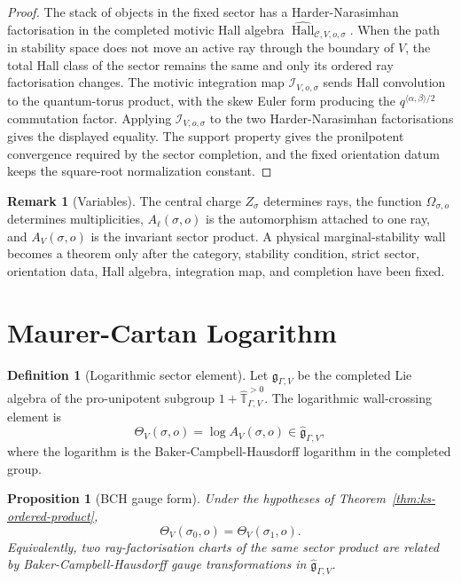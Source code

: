 \documentclass[11pt]{article}
\newtheorem{proposition}[theorem]{Proposition}
\theoremstyle{definition}
\newtheorem{definition}[theorem]{Definition}
\newtheorem{remark}[theorem]{Remark}
\providecommand{\cC}{\mathcal{C}}
\providecommand{\Hall}{\operatorname{Hall}}
\providecommand{\fg}{\mathfrak{g}}
\begin{document}
\begin{proof}
The stack of objects in the fixed sector has a Harder-Narasimhan
factorisation in the completed motivic Hall algebra
$\widehat{\Hall}_{\cC,V,o,\sigma}$.  When the path in stability space
does not move an active ray through the boundary of $V$, the total Hall
class of the sector remains the same and only its ordered ray
factorisation changes.  The motivic integration map
$\mathcal I_{V,o,\sigma}$ sends Hall convolution to the quantum-torus
product, with the skew Euler form producing the
$q^{\langle\alpha,\beta\rangle/2}$ commutation factor.  Applying
$\mathcal I_{V,o,\sigma}$ to the two Harder-Narasimhan
factorisations gives the displayed equality.  The support property gives
the pronilpotent convergence required by the sector completion, and the
fixed orientation datum keeps the square-root normalization constant.
\end{proof}

\begin{remark}[Variables]
The central charge $Z_\sigma$ determines rays, the function
$\Omega_{\sigma,o}$ determines multiplicities, $A_\ell(\sigma,o)$ is the
automorphism attached to one ray, and $A_V(\sigma,o)$ is the invariant
sector product.  A physical marginal-stability wall becomes a theorem
only after the category, stability condition, strict sector, orientation
data, Hall algebra, integration map, and completion have been fixed.
\end{remark}

\section{Maurer-Cartan Logarithm}

\begin{definition}[Logarithmic sector element]
Let $\fg_{\Gamma,V}$ be the completed Lie algebra of the pro-unipotent
subgroup $1+\widehat{\mathbb T}_{\Gamma,V}^{>0}$.  The logarithmic
wall-crossing element is
\[
 \Theta_V(\sigma,o)=\log A_V(\sigma,o)\in\widehat{\fg}_{\Gamma,V},
\]
where the logarithm is the Baker-Campbell-Hausdorff logarithm in the
completed group.
\end{definition}

\begin{proposition}[BCH gauge form]
\label{prop:mc-interpretation}
Under the hypotheses of Theorem~\ref{thm:ks-ordered-product},
\[
 \Theta_V(\sigma_0,o)=\Theta_V(\sigma_1,o).
\]
Equivalently, two ray-factorisation charts of the same sector product
are related by Baker-Campbell-Hausdorff gauge transformations in
$\widehat{\fg}_{\Gamma,V}$.
\end{proposition}
\end{document}
